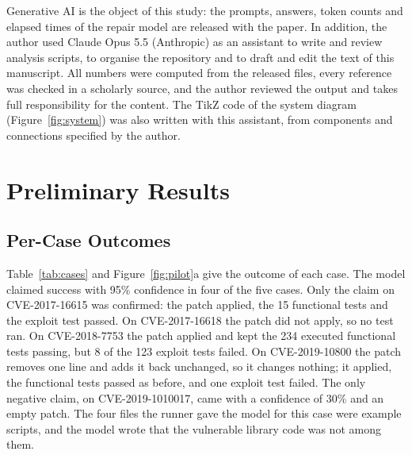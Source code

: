 \documentclass[ai,article,submit,oneauthor]{Definitions/mdpi}
\begin{document}
Generative AI is the object of this study: the prompts, answers, token counts and elapsed times of the repair model are released with the paper. In addition, the author used Claude Opus 5.5 (Anthropic) as an assistant to write and review analysis scripts, to organise the repository and to draft and edit the text of this manuscript. All numbers were computed from the released files, every reference was checked in a scholarly source, and the author reviewed the output and takes full responsibility for the content. The TikZ code of the system diagram (Figure~\ref{fig:system}) was also written with this assistant, from components and connections specified by the author.

\section{Preliminary Results}\label{sec:results}

\subsection{Per-Case Outcomes}

Table~\ref{tab:cases} and Figure~\ref{fig:pilot}a give the outcome of each case. The model claimed success with 95\% confidence in four of the five cases. Only the claim on CVE-2017-16615 was confirmed: the patch applied, the 15 functional tests and the exploit test passed. On CVE-2017-16618 the patch did not apply, so no test ran. On CVE-2018-7753 the patch applied and kept the 234 executed functional tests passing, but 8 of the 123 exploit tests failed. On CVE-2019-10800 the patch removes one line and adds it back unchanged, so it changes nothing; it applied, the functional tests passed as before, and one exploit test failed. The only negative claim, on CVE-2019-1010017, came with a confidence of 30\% and an empty patch. The four files the runner gave the model for this case were example scripts, and the model wrote that the vulnerable library code was not among them.
\end{document}
